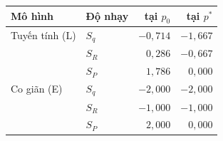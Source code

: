 
\begin{tabular}{@{}llrr@{}}
\toprule
Mô hình & Độ nhạy & tại $p_0$ & tại $p^*$ \\
\midrule
Tuyến tính (L) & $S_q$ & ${-}0{,}714$ & ${-}1{,}667$ \\
 & $S_R$ & $0{,}286$ & ${-}0{,}667$ \\
 & $S_P$ & $1{,}786$ & $0{,}000$ \\
\midrule
Co giãn (E) & $S_q$ & ${-}2{,}000$ & ${-}2{,}000$ \\
 & $S_R$ & ${-}1{,}000$ & ${-}1{,}000$ \\
 & $S_P$ & $2{,}000$ & $0{,}000$ \\
\bottomrule
\end{tabular}
